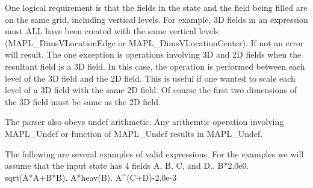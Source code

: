 One logical requirement is that the fields in the state and the field being filled are on the same grid,
including vertical levels. For example, 3D fields in an expression must ALL have been created with
the same vertical levels (MAPL\_DimsVLocationEdge or MAPL\_DimsVLocationCenter). If not an error will result.
The one exception is operations involving 3D and 2D fields when
the resultant field is a 3D field. In this case, the operation is performed between each level
of the 3D field and the 2D field. This is useful if one wanted to scale each level of a 3D
field with the same 2D field. Of course the first two dimensions of the 3D field must be same as the 2D field.

The parser also obeys undef arithmetic. Any arithemtic operation involving MAPL\_Undef or function of MAPL\_Undef
results in MAPL\_Undef.

The following are several examples of valid expressions. For the examples we will assume that the input state
has 4 fields A, B, C, and D.. B*2.0e0. sqrt(A*A+B*B). A*heav(B). A\^{}(C+D)-2.0e-3
